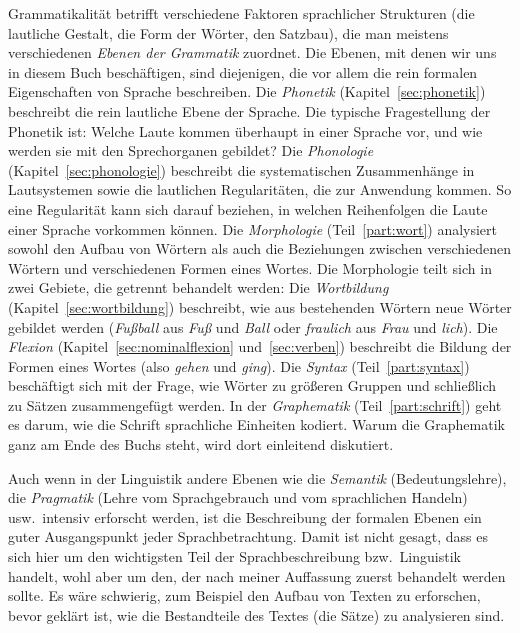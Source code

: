 Grammatikalität betrifft verschiedene Faktoren sprachlicher Strukturen (\zB die lautliche Gestalt, die Form der Wörter, den Satzbau), die man meistens verschiedenen \textit{Ebenen der Grammatik} zuordnet.
Die Ebenen, mit denen wir uns in diesem Buch beschäftigen, sind diejenigen, die vor allem die rein formalen Eigenschaften von Sprache beschreiben.
Die \textit{Phonetik} (Kapitel~\ref{sec:phonetik}) beschreibt die rein lautliche Ebene der Sprache.
Die typische Fragestellung der Phonetik ist:
Welche Laute kommen überhaupt in einer Sprache vor, und wie werden sie mit den Sprechorganen gebildet?
Die \textit{Phonologie} (Kapitel~\ref{sec:phonologie}) beschreibt die systematischen Zusammenhänge in Lautsystemen sowie die lautlichen Regularitäten, die zur Anwendung kommen.
So eine Regularität kann sich \zB darauf beziehen, in welchen Reihenfolgen die Laute einer Sprache vorkommen können.
Die \textit{Morphologie} (Teil~\ref{part:wort}) analysiert sowohl den Aufbau von Wörtern als auch die Beziehungen zwischen verschiedenen Wörtern und verschiedenen Formen eines Wortes.
Die Morphologie teilt sich in zwei Gebiete, die getrennt behandelt werden:
Die \textit{Wortbildung} (Kapitel~\ref{sec:wortbildung}) beschreibt, wie aus bestehenden Wörtern neue Wörter gebildet werden (\zB \textit{Fußball} aus \textit{Fuß} und \textit{Ball} oder \textit{fraulich} aus \textit{Frau} und \textit{lich}).
Die \textit{Flexion} (Kapitel~\ref{sec:nominalflexion} und~\ref{sec:verben}) beschreibt die Bildung der Formen eines Wortes (also \zB \textit{gehen} und \textit{ging}).
Die \textit{Syntax} (Teil~\ref{part:syntax}) beschäftigt sich mit der Frage, wie Wörter zu größeren Gruppen und schließlich zu Sätzen zusammengefügt werden.
In der \textit{Graphematik} (Teil~\ref{part:schrift}) geht es darum, wie die Schrift sprachliche Einheiten kodiert.
Warum die Graphematik ganz am Ende des Buchs steht, wird dort einleitend diskutiert.

Auch wenn in der Linguistik andere Ebenen wie die \textit{Semantik} (Bedeutungslehre), die \textit{Pragmatik} (Lehre vom Sprachgebrauch und vom sprachlichen Handeln) usw.\ intensiv erforscht werden, ist die Beschreibung der formalen Ebenen ein guter Ausgangspunkt jeder Sprachbetrachtung.
Damit ist nicht gesagt, dass es sich hier um den wichtigsten Teil der Sprachbeschreibung bzw.\ Linguistik handelt, wohl aber um den, der nach meiner Auffassung zuerst behandelt werden sollte.
Es wäre schwierig, zum Beispiel den Aufbau von Texten zu erforschen, bevor geklärt ist, wie die Bestandteile des Textes (die Sätze) zu analysieren sind.

